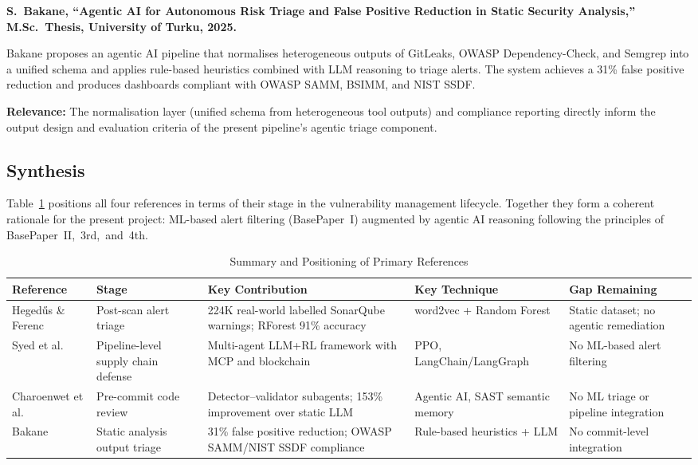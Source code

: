 \documentclass[conference]{IEEEtran}
\begin{document}
\textbf{S.\ Bakane, ``Agentic AI for Autonomous Risk Triage and False Positive
Reduction in Static Security Analysis,'' M.Sc.\ Thesis, University of Turku,
2025.} \cite{bakane2025thesis}

Bakane proposes an agentic AI pipeline that normalises heterogeneous outputs of
GitLeaks, OWASP Dependency-Check, and Semgrep into a unified schema and applies
rule-based heuristics combined with LLM reasoning to triage alerts. The system
achieves a 31\% false positive reduction and produces dashboards compliant with
OWASP SAMM, BSIMM, and NIST SSDF.

\textbf{Relevance:} The normalisation layer (unified schema from heterogeneous
tool outputs) and compliance reporting directly inform the output design and
evaluation criteria of the present pipeline's agentic triage component.

\subsection{Synthesis}

Table~\ref{tab:litreview} positions all four references in terms of their stage in
the vulnerability management lifecycle. Together they form a coherent rationale
for the present project: ML-based alert filtering (BasePaper~I) augmented by
agentic AI reasoning following the principles of BasePaper~II,~3rd,~and~4th.

\begin{table}[htbp]
  \centering
  \caption{Summary and Positioning of Primary References}
  \label{tab:litreview}
  \renewcommand{\arraystretch}{1.35}
  \begin{tabular}{lp{2.3cm}p{4.2cm}p{2.6cm}p{2.6cm}}
    \toprule
    \textbf{Reference} & \textbf{Stage} &
    \textbf{Key Contribution} & \textbf{Key Technique} &
    \textbf{Gap Remaining} \\
    \midrule
    Heged\H{u}s \& Ferenc \cite{hegedus2022sca} &
      Post-scan alert triage &
      224K real-world labelled SonarQube warnings; RForest 91\% accuracy &
      word2vec + Random Forest &
      Static dataset; no agentic remediation \\
    Syed et al.\ \cite{syed2025agentic} &
      Pipeline-level supply chain defense &
      Multi-agent LLM+RL framework with MCP and blockchain &
      PPO, LangChain/LangGraph &
      No ML-based alert filtering \\
    Charoenwet et al.\ \cite{charoenwet2026agenticscr} &
      Pre-commit code review &
      Detector--validator subagents; 153\% improvement over static LLM &
      Agentic AI, SAST semantic memory &
      No ML triage or pipeline integration \\
    Bakane \cite{bakane2025thesis} &
      Static analysis output triage &
      31\% false positive reduction; OWASP SAMM/NIST SSDF compliance &
      Rule-based heuristics + LLM &
      No commit-level integration \\
    \bottomrule
  \end{tabular}
\end{table}
\end{document}
